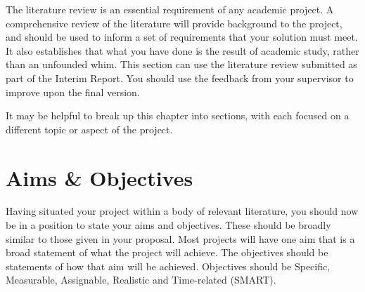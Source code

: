 The literature review is an essential requirement of any academic project. A comprehensive review of the literature will provide background to the project, and should be used to inform a set of requirements that your solution must meet. It also establishes that what you have done is the result of academic study, rather than an unfounded whim. This section can use the literature review submitted as part of the Interim Report. You should use the feedback from your supervisor to improve upon the final version. 

It may be helpful to break up this chapter into sections, with each focused on a different topic or aspect of the project.

\section{Aims \& Objectives}
Having situated your project within a body of relevant literature, you should now be in a position to state your aims and objectives. These should be broadly similar to those given in your proposal. Most projects will have one aim that is a broad statement of what the project will achieve. The objectives should be statements of how that aim will be achieved. Objectives should be Specific, Measurable, Assignable, Realistic and Time-related (SMART).